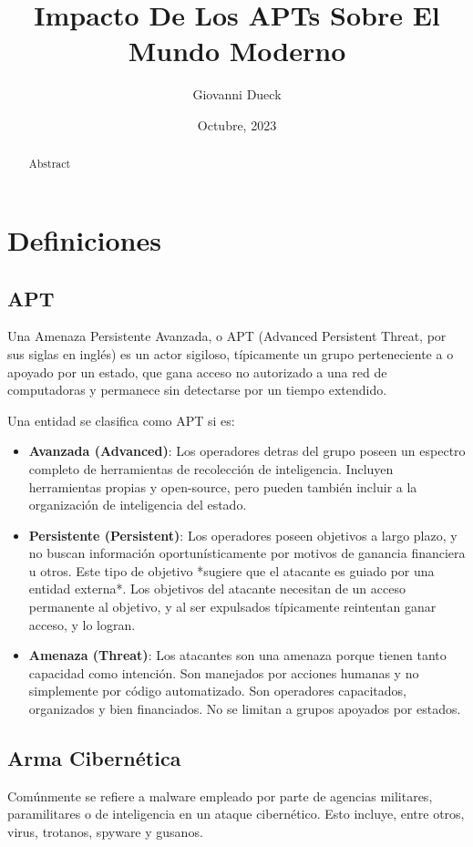 \documentclass{article}
\title{Impacto De Los APTs Sobre El Mundo Moderno}
\author{Giovanni Dueck}
\date{Octubre, 2023}
\begin{document}
\maketitle

\begin{abstract}
    Abstract
\end{abstract}

\section{Definiciones}
\subsection{APT}
Una Amenaza Persistente Avanzada, o APT (Advanced Persistent Threat, por sus siglas en inglés) es un actor sigiloso, típicamente un grupo perteneciente a o apoyado por un estado, que gana acceso no autorizado a una red de computadoras y permanece sin detectarse por un tiempo extendido. 

Una entidad se clasifica como APT si es:
\begin{itemize}
    \item {\bf Avanzada (Advanced)}: Los operadores detras del grupo poseen un espectro completo de herramientas de recolección de inteligencia. Incluyen herramientas propias y open-source, pero pueden también incluir a la organización de inteligencia del estado.
    \item {\bf Persistente (Persistent)}: Los operadores poseen objetivos a largo plazo, y no buscan información oportunísticamente por motivos de ganancia financiera u otros. Este tipo de objetivo *sugiere que el atacante es guiado por una entidad externa*. Los objetivos del atacante necesitan de un acceso permanente al objetivo, y al ser expulsados típicamente reintentan ganar acceso, y lo logran.
    \item {\bf Amenaza (Threat)}: Los atacantes son una amenaza porque tienen tanto capacidad como intención. Son manejados por acciones humanas y no simplemente por código automatizado. Son operadores capacitados, organizados y bien financiados. No se limitan a grupos apoyados por estados.
\end{itemize}

\subsection{Arma Cibernética}
Comúnmente se refiere a malware empleado por parte de agencias militares, paramilitares o de inteligencia en un ataque cibernético. Esto incluye, entre otros, virus, trotanos, spyware y gusanos.
\end{document}

